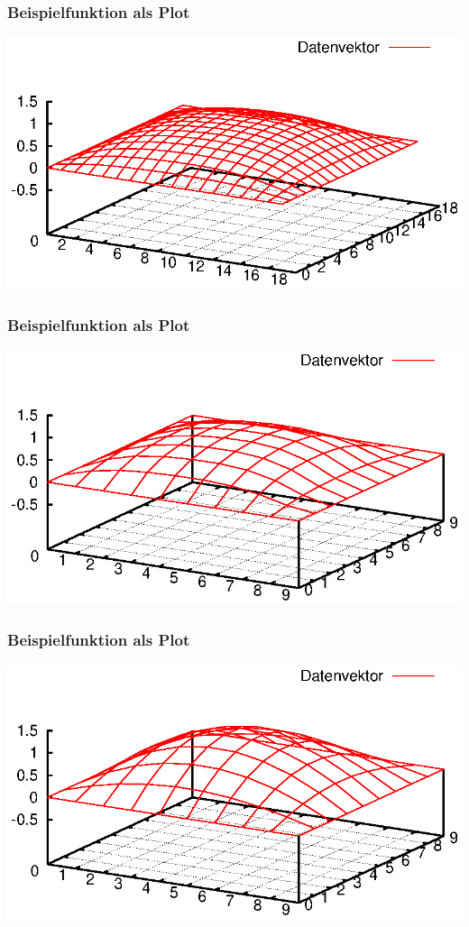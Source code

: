 \documentclass{beamer}
\begin{document}
\begin{frame}\frametitle{Beispielfunktion als Plot}\includegraphics[trim=25 0 25 0, clip, width=\textwidth]{plots/003}\end{frame}
\begin{frame}\frametitle{Beispielfunktion als Plot}\includegraphics[trim=25 0 25 0, clip, width=\textwidth]{plots/004}\end{frame}
\begin{frame}\frametitle{Beispielfunktion als Plot}\includegraphics[trim=25 0 25 0, clip, width=\textwidth]{plots/005}\end{frame}
\end{document}
